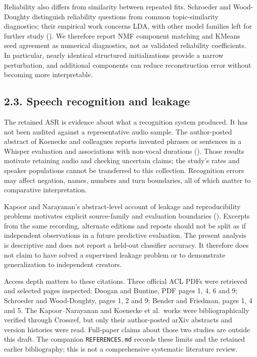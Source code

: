 \documentclass[
  11pt,
]{article}
\begin{document}
Reliability also differs from similarity between repeated fits.
Schroeder and Wood-Doughty distinguish reliability questions from common
topic-similarity diagnostics; their empirical work concerns LDA, with
other model families left for further study
(). We
therefore report NMF component matching and KMeans seed agreement as
numerical diagnostics, not as validated reliability coefficients. In
particular, nearly identical structured initializations provide a narrow
perturbation, and additional components can reduce reconstruction error
without becoming more interpretable.

\FloatBarrier

\subsection{2.3. Speech recognition and
leakage}\label{speech-recognition-and-leakage}

The retained ASR is evidence about what a recognition system produced.
It has not been audited against a representative audio sample. The
author-posted abstract of Koenecke and colleagues reports invented
phrases or sentences in a Whisper evaluation and associations with
non-vocal durations ().
Those results motivate retaining audio and checking uncertain claims;
the study's rates and speaker populations cannot be transferred to this
collection. Recognition errors may affect negation, names, numbers and
turn boundaries, all of which matter to comparative interpretation.

Kapoor and Narayanan's abstract-level account of leakage and
reproducibility problems motivates explicit source-family and evaluation
boundaries ().
Excerpts from the same recording, alternate editions and reposts should
not be split as if independent observations in a future predictive
evaluation. The present analysis is descriptive and does not report a
held-out classifier accuracy. It therefore does not claim to have solved
a supervised leakage problem or to demonstrate generalization to
independent creators.

Access depth matters to these citations. Three official ACL PDFs were
retrieved and selected pages inspected: Doogan and Buntine, PDF pages 1,
4, 6 and 9; Schroeder and Wood-Doughty, pages 1, 2 and 9; Bender and
Friedman, pages 1, 4 and 5. The Kapoor--Narayanan and Koenecke et
al.~works were bibliographically verified through Crossref, but only
their author-posted arXiv abstracts and version histories were read.
Full-paper claims about those two studies are outside this draft. The
companion \texttt{REFERENCES.md} records these limits and the retained
earlier bibliography; this is not a comprehensive systematic literature
review.
\end{document}
